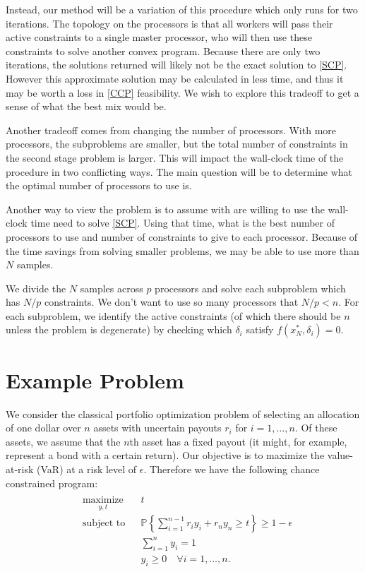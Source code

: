 \documentclass[12pt]{article}
\begin{document}
Instead, our method will be a variation of this procedure which only runs for two iterations.
The topology on the processors is that all workers will pass their active constraints to a single master processor, who will then use these constraints to solve another convex program.
Because there are only two iterations, the solutions returned will likely not be the exact solution to \ref{SCP}.
However this approximate solution may be calculated in less time, and thus it may be worth a loss in \ref{CCP} feasibility.
We wish to explore this tradeoff to get a sense of what the best mix would be.

Another tradeoff comes from changing the number of processors.
With more processors, the subproblems are smaller, but the total number of constraints in the second stage problem is larger.
This will impact the wall-clock time of the procedure in two conflicting ways.
The main question will be to determine what the optimal number of processors to use is.

Another way to view the problem is to assume with are willing to use the wall-clock time need to solve \ref{SCP}.
Using that time, what is the best number of processors to use and number of constraints to give to each processor. Because of the time savings from solving smaller problems, we may be able to use more than $N$ samples.

We divide the $N$ samples across $p$ processors and solve each subproblem which has $N/p$ constraints.
We don't want to use so many processors that $N/p < n$.
For each subproblem, we identify the active constraints (of which there should be $n$ unless the problem is degenerate) by checking which $\delta_i$ satisfy $f(x_N^*, \delta_i) = 0$.

\section*{Example Problem}

We consider the classical portfolio optimization problem of selecting an allocation of one dollar over $n$ assets with uncertain payouts $r_i$ for $i = 1, \ldots, n$.
Of these assets, we assume that the $n$th asset has a fixed payout (it might, for example, represent a bond with a certain return).
Our objective is to maximize the value-at-risk (VaR) at a risk level of $\epsilon$.
Therefore we have the following chance constrained program:
\begin{align}\label{PortfolioCCP}
\begin{split}
\begin{aligned}
    & \underset{y, t}{\text{maximize}}
    & & t \\
    & \text{subject to}
    & & \mathbb{P}\left\{ \sum_{i=1}^{n-1} r_i y_i + r_n y_n \geq t \right\} \geq 1-\epsilon \\
    & & & \sum_{i=1}^n y_i = 1 \\
    & & & y_i \geq 0 \quad \forall i = 1, \ldots, n.
\end{aligned}
\end{split} \tag{Portfolio CCP}
\end{align}
\end{document}
